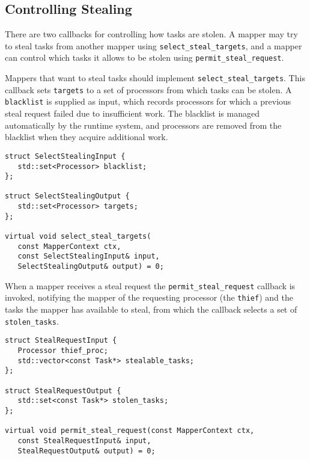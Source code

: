 \subsection{Controlling Stealing}
\label{subsec:mapping:stealing}

There are two callbacks for controlling how tasks are stolen.  A mapper may try to steal tasks from another mapper using {\tt select\_steal\_targets}, and a mapper can control which tasks it allows to be stolen using {\tt permit\_steal\_request}.

Mappers that want to steal tasks should implement {\tt select\_steal\_targets}.  This callback sets
{\tt targets} to a set of processors from which tasks can be stolen.  A {\tt blacklist} is supplied as input, which records processors
for which a previous steal request failed due to insufficient work.  The blacklist is managed automatically by the runtime system, and
processors are removed from the blacklist when they acquire additional work.
\begin{lstlisting}
struct SelectStealingInput {
   std::set<Processor> blacklist;
};

struct SelectStealingOutput {
   std::set<Processor> targets;
};

virtual void select_steal_targets(
   const MapperContext ctx,
   const SelectStealingInput& input,
   SelectStealingOutput& output) = 0;
\end{lstlisting}

When a mapper receives a steal request the {\tt permit\_steal\_request} callback is invoked, notifying the mapper of the requesting
processor (the {\tt thief}) and the tasks the mapper has available to steal, from which the callback selects a set of {\tt stolen\_tasks}.
\begin{lstlisting}
struct StealRequestInput {
   Processor thief_proc;
   std::vector<const Task*> stealable_tasks;
};

struct StealRequestOutput {
   std::set<const Task*> stolen_tasks;
};

virtual void permit_steal_request(const MapperContext ctx,
   const StealRequestInput& input,
   StealRequestOutput& output) = 0;
\end{lstlisting}




